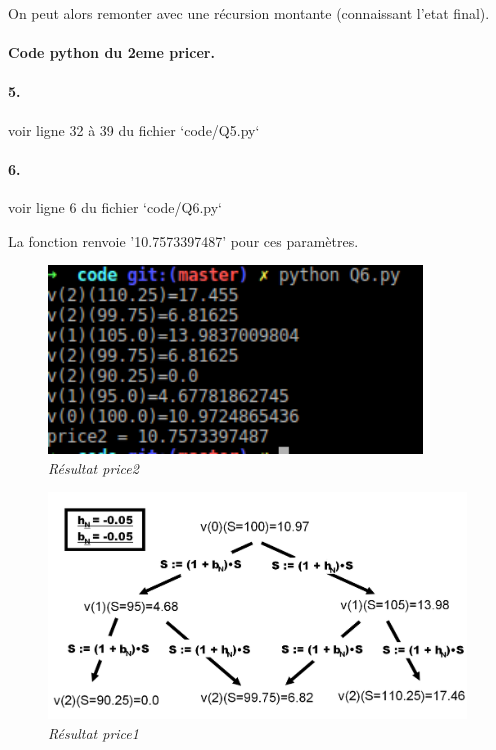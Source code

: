 \documentclass[10pt]{article}
\begin{document}
  On peut alors remonter avec une récursion montante (connaissant l'etat final).
  
  \paragraph{Code python du 2eme pricer.}
  
  \paragraph{5.} voir ligne 32 à 39 du fichier `code/Q5.py`
  
  \paragraph{6.} voir ligne 6 du fichier `code/Q6.py`
  
  La fonction renvoie '10.7573397487' pour ces paramètres.
  
  \begin{figure}[H]
    \begin{center}
      \includegraphics[height=5cm,keepaspectratio]{./images/q6.png}
    \end{center}
    \caption{\textit{Résultat price2}}
    \label{q6}
  \end{figure}
  
  \begin{figure}[H]
    \begin{center}
      \includegraphics[height=6cm,keepaspectratio]{./images/q6_tree.png}
    \end{center}
    \caption{\textit{Résultat price1}}
    \label{q6_tree}
  \end{figure}
  
\end{document}
